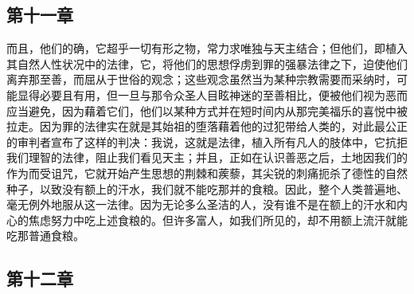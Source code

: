 
\subsection{第十一章}

\par

而且，他们的确，它超乎一切有形之物，常力求唯独与天主结合；但他们，即植入其自然人性状况中的法律，它，将他们的思想俘虏到罪的强暴法律之下，迫使他们离弃那至善，而屈从于世俗的观念；这些观念虽然当为某种宗教需要而采纳时，可能显得必要且有用，但一旦与那令众圣人目眩神迷的至善相比，便被他们视为恶而应当避免，因为藉着它们，他们以某种方式并在短时间内从那完美福乐的喜悦中被拉走。因为罪的法律实在就是其始祖的堕落藉着他的过犯带给人类的，对此最公正的审判者宣布了这样的判决：我说，这就是法律，植入所有凡人的肢体中，它抗拒我们理智的法律，阻止我们看见天主；并且，正如在认识善恶之后，土地因我们的作为而受诅咒，它就开始产生思想的荆棘和蒺藜，其尖锐的刺痛扼杀了德性的自然种子，以致没有额上的汗水，我们就不能吃那并的食粮。因此，整个人类普遍地、毫无例外地服从这一法律。因为无论多么圣洁的人，没有谁不是在额上的汗水和内心的焦虑努力中吃上述食粮的。但许多富人，如我们所见的，却不用额上流汗就能吃那普通食粮。\par


\subsection{第十二章}

\par

